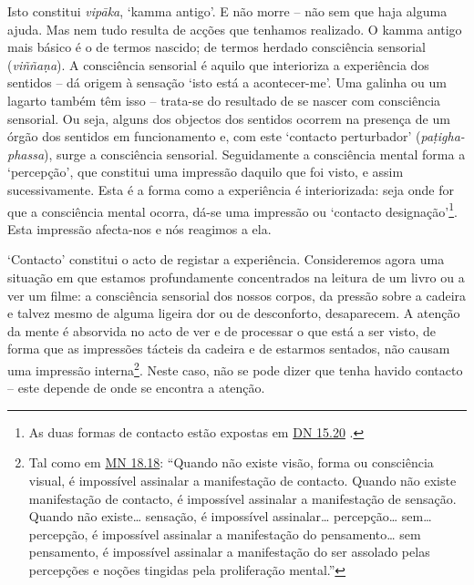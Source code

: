 Isto constitui \emph{vipāka}, `kamma antigo'. E não morre -- não sem que haja alguma ajuda. Mas nem tudo resulta de acções que tenhamos realizado. O kamma antigo mais básico é o de termos nascido; de termos herdado consciência sensorial (\emph{viññaṇa}). A consciência sensorial é aquilo que interioriza a experiência dos sentidos -- dá origem à sensação `isto está a acontecer-me'. Uma galinha ou um lagarto também têm isso -- trata-se do resultado de se nascer com consciência sensorial. Ou seja, alguns dos objectos dos sentidos ocorrem na presença de um órgão dos sentidos em funcionamento e, com este `contacto perturbador' (\emph{paṭigha-phassa}), surge a consciência sensorial. Seguidamente a consciência mental forma a `percepção', que constitui uma impressão daquilo que foi visto, e assim sucessivamente. Esta é a forma como a experiência é interiorizada: seja onde for que a consciência mental ocorra, dá-se uma impressão ou `contacto designação'\footnote{As duas formas de contacto estão expostas em \href{https://suttacentral.net/dn15/en/bodhi}{DN 15.20} .}. Esta impressão afecta-nos e nós reagimos a ela.

`Contacto' constitui o acto de registar a experiência. Consideremos agora uma situação em que estamos profundamente concentrados na leitura de um livro ou a ver um filme: a consciência sensorial dos nossos corpos, da pressão sobre a cadeira e talvez mesmo de alguma ligeira dor ou de desconforto, desaparecem. A atenção da mente é absorvida no acto de ver e de processar o que está a ser visto, de forma que as impressões tácteis da cadeira e de estarmos sentados, não causam uma impressão interna\footnote{Tal como em \href{https://suttacentral.net/mn18/en/nyanamoli-thera}{MN 18.18}: ``Quando não existe visão, forma ou consciência visual, é impossível assinalar a manifestação de contacto. Quando não existe manifestação de contacto, é impossível assinalar a manifestação de sensação. Quando não existe\ldots{} sensação, é impossível assinalar\ldots{} percepção\ldots{} sem\ldots{} percepção, é impossível assinalar a manifestação do pensamento\ldots{} sem pensamento, é impossível assinalar a manifestação do ser assolado pelas percepções e noções tingidas pela proliferação mental.''}. Neste caso, não se pode dizer que tenha havido contacto -- este depende de onde se encontra a atenção.

